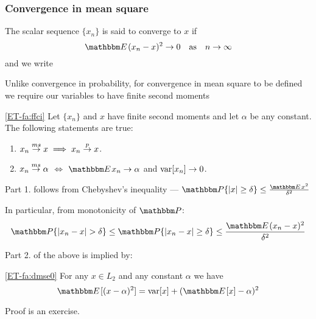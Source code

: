 \begin{frame}\frametitle{Convergence in mean square}
    
    \vspace{2em}
    The scalar sequence $\{x_n\}$ is said to converge to $x$  
    if
    \begin{equation}
        \label{eq:cims}
        \EE (x_n - x)^2   \to 0 
        \quad \text{as} \quad n \to \infty
    \end{equation}
    and we write 
    
    \vspace{1em}
    Unlike convergence in probability, for
    convergence in mean square to be defined we require our variables to have
    finite second moments
    
\end{frame}

\begin{frame}
    
    \vspace{2em}
    \Fact\eqref{ET-fa:ffci}
    Let $\{x_n\}$ and $x$ have finite second moments and let $\alpha$ be any
    constant.  The following statements are true:
    \begin{enumerate}
        \item $x_n \stackrel { ms } {\to} x \implies x_n \stackrel { p } {\to} x$.
        \item $x_n \stackrel { ms } {\to} \alpha$ $\iff$ $\EE x_n \to \alpha$ and $\operatorname{var}[x_n]
            \to 0$.
    \end{enumerate}
    
    \vspace{1em}
    Part 1. follows from Chebyshev's inequality --- $\PP\{|x| \geq \delta \} \leq \frac{\EE x^2}{\delta^2}$
    
    In particular, from monotonicity of $\PP$:
    \begin{equation*}
        \PP\{|x_n - x| > \delta \} 
        \leq \PP\{|x_n - x| \geq \delta \} 
        \leq \frac{\EE (x_n - x)^2}{\delta^2}
    \end{equation*}
\end{frame}

\begin{frame}

    \vspace{2em}
    Part 2. of the above is implied by:
    
    \Fact\eqref{ET-fa:dmse0}
        For any $x \in L_2$ and any constant $\alpha$ we have
        \begin{equation}
            \label{eq:dmse0}
            \EE [ (x - \alpha)^2 ] = \var[x] + (\EE[x] - \alpha)^2
        \end{equation}
        
    Proof is an exercise. 
    

\end{frame}

